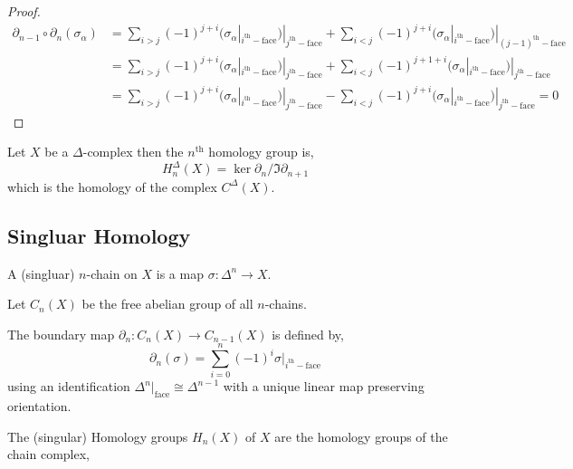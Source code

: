 \documentclass[12pt]{extarticle}
\begin{document}
\begin{proof}
\begin{align*} 
\partial_{n-1} \circ \partial_n(\sigma_\alpha) 
& = \sum_{i > j} (-1)^{j + i} (\sigma_\alpha|_{i^{\mathrm{th}}-\text{face}})|_{j^{\mathrm{th}}-\text{face}} + \sum_{i < j} (-1)^{j + i} (\sigma_\alpha|_{i^{\mathrm{th}}-\text{face}})|_{(j-1)^{\mathrm{th}}-\text{face}}
\\
& = \sum_{i > j} (-1)^{j + i} (\sigma_\alpha|_{i^{\mathrm{th}}-\text{face}})|_{j^{\mathrm{th}}-\text{face}} + \sum_{i < j} (-1)^{j + 1 + i} (\sigma_\alpha|_{i^{\mathrm{th}}-\text{face}})|_{j^{\mathrm{th}}-\text{face}}
\\
& = \sum_{i > j} (-1)^{j + i} (\sigma_\alpha|_{i^{\mathrm{th}}-\text{face}})|_{j^{\mathrm{th}}-\text{face}} - \sum_{i < j} (-1)^{j + i} (\sigma_\alpha|_{i^{\mathrm{th}}-\text{face}})|_{j^{\mathrm{th}}-\text{face}} = 0
\end{align*}
\end{proof}

\begin{definition}
Let $X$ be a $\Delta$-complex then the $n^{\mathrm{th}}$ homology group is,
\[ H^\Delta_n(X) = \ker{\partial_n}/\Im{\partial_{n + 1}} \]
which is the homology of the complex $C^\Delta(X)$. 
\end{definition}


\subsection{Singluar Homology}

\begin{definition}
A (singluar) $n$-chain on $X$ is a map $\sigma : \Delta^n \to X$. 
\end{definition}

\begin{definition}
Let $C_n(X)$ be the free abelian group of all $n$-chains. 
\end{definition}

\begin{definition}
The boundary map $\partial_n : C_n(X) \to C_{n-1}(X)$ is defined by,
\[ \partial_n(\sigma) = \sum_{i = 0}^n (-1)^i \sigma|_{i^{\mathrm{th}}-\text{face}}\]
using an identification $\Delta^n |_{\text{face}} \cong \Delta^{n-1}$ with a unique linear map preserving orientation. 
\end{definition}

\begin{definition}
The (singular) Homology groups $H_n(X)$ of $X$ are the homology groups of the chain complex,
\begin{center}
\end{center}
\end{definition}
\end{document}
